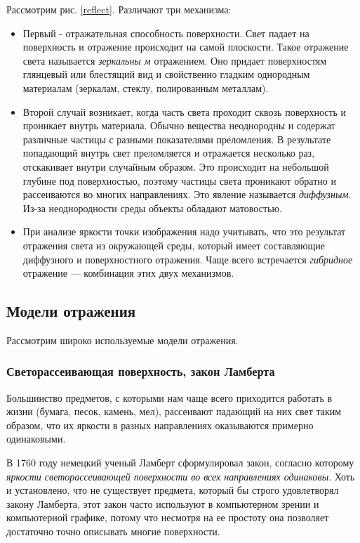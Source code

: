 Рассмотрим рис. \eqref{reflect}. Различают три механизма:
\begin{itemize}
  \item Первый - отражательная способность поверхности. Свет падает на поверхность
        и отражение происходит на самой плоскости. Такое отражение света называется
        \textit{зеркальны м} отражением. Оно придает поверхностям глянцевый или блестящий
        вид и свойственно гладким однородным материалам (зеркалам, стеклу, полированным металлам).
  \item Второй случай возникает, когда часть света проходит сквозь поверхность
        и проникает внутрь материала. Обычно вещества неоднородны и содержат различные
        частицы с разными показателями преломления. В результате попадающий внутрь свет
        преломляется и отражается несколько раз, отскакивает внутри случайным образом.
        Это происходит на небольшой глубине под поверхностью, поэтому частицы света
        проникают обратно и рассеиваются во многих направлениях.
        Это явление называется \textit{диффузным}. Из-за неоднородности среды
        объекты обладают матовостью.
  \item При анализе яркости точки изображения надо учитывать, что это результат отражения света из окружающей среды, который имеет составляющие
        диффузного и поверхностного отражения. Чаще всего встречается \textit{гибридное} отражение — комбинация этих двух механизмов.
\end{itemize}

\subsection{Модели отражения}

Рассмотрим широко используемые модели отражения.

\subsubsection{Светорассеивающая поверхность, закон Ламберта}

Большинство предметов, с которыми нам чаще всего приходится работать в жизни
(бумага, песок, камень, мел), рассеивают падающий на них свет таким образом,
что их яркости в разных направлениях оказываются примерно одинаковыми.

В 1760 году немецкий ученый Ламберт сформулировал закон, согласно которому
\textit{яркости светорассеивающей поверхности во всех направлениях одинаковы}.
Хоть и установлено, что не существует предмета, который бы строго удовлетворял
закону Ламберта, этот закон часто используют в компьютерном зрении и
компьютерной графике, потому что несмотря на ее простоту она
позволяет достаточно точно описывать многие поверхности.

